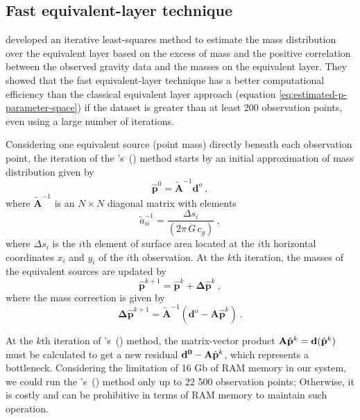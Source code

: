 \subsection{Fast equivalent-layer technique}

\citet{siqueira-etal2017} developed an iterative least-squares method to estimate the mass 
distribution over the equivalent layer based on the excess of mass and the positive correlation 
between the observed gravity data and the masses on the equivalent layer. They showed 
that the fast equivalent-layer technique has a better computational efficiency than the 
classical equivalent layer approach (equation \ref{eq:estimated-p-parameter-space}) if the 
dataset is greater than at least 200 observation points, even using a large number of iterations.

Considering one equivalent source (point mass) directly beneath each observation point, 
the iteration of the \citeauthor{siqueira-etal2017}'s~(\citeyear{siqueira-etal2017}) method 
starts by an initial approximation of mass distribution given by
\begin{equation}
\hat{\mathbf{p}}^0 = \tilde{\mathbf{A}}^{-1} \mathbf{d}^{o} \: ,
\label{eq:p0_fast_eqlayer}
\end{equation}
where $\tilde{\mathbf{A}}^{-1}$ is an $N \times N$ diagonal matrix with elements
\begin{equation}
\tilde{a}_{ii}^{-1} = \frac{\Delta s_i}{(2 \pi \, G \, c_g)} \: ,
\label{eq:aii_tilde_inv_fast_eqlayer}
\end{equation}
where $\Delta s_i$ is the $i$th element of surface area located at the $i$th horizontal 
coordinates $x_i$ and $y_i$ of the $i$th observation.
At the $k$th iteration, the masses of the equivalent sources are updated by
\begin{equation}
\hat{\mathbf{p}}^{k+1} = \hat{\mathbf{p}}^{k} + \mathbf{\Delta} \hat{\mathbf{p}}^{k} \: ,
\label{eq:p_k+1_fast_eqlayer}
\end{equation}
where the mass correction is given by
\begin{equation}
\mathbf{\Delta} \hat{\mathbf{p}}^{k+1} = \tilde{\mathbf{A}}^{-1} (\mathbf{d}^{o} - \mathbf{A} \hat{\mathbf{p}}^{k}) \: .
\label{eq:delta_p_k_fast_eqlayer}
\end{equation}

At the $k$th iteration of \citeauthor{siqueira-etal2017}'s~(\citeyear{siqueira-etal2017}) method, 
the matrix-vector product 
$\tensor{A} \hat{\mathbf{p}}^{k} = \mathbf{d}(\hat{\mathbf{p}}^{k})$ must be calculated to get a 
new residual $\mathbf{d^0} - \tensor{A} \hat{\mathbf{p}}^{k}$, which represents a bottleneck. 
Considering the limitation of 16 Gb of RAM memory in our system, we could run the 
\citeauthor{siqueira-etal2017}'s~(\citeyear{siqueira-etal2017}) method only up to 22 500 observation points;
Otherwise, it is costly and can be prohibitive in terms of RAM 
memory to maintain such operation.

